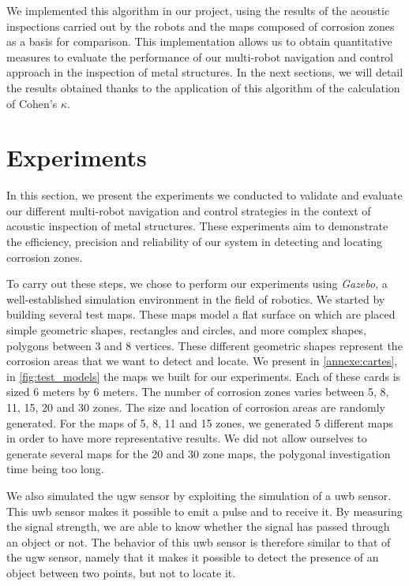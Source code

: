 We implemented this algorithm in our project, using the results of the acoustic inspections carried out by the robots and the maps composed of corrosion zones as a basis for comparison.
This implementation allows us to obtain quantitative measures to evaluate the performance of our multi-robot navigation and control approach in the inspection of metal structures.
In the next sections, we will detail the results obtained thanks to the application of this algorithm of the calculation of Cohen's $\kappa$.

\section{Experiments}

In this section, we present the experiments we conducted to validate and evaluate our different multi-robot navigation and control strategies in the context of acoustic inspection of metal structures.
These experiments aim to demonstrate the efficiency, precision and reliability of our system in detecting and locating corrosion zones.

To carry out these steps, we chose to perform our experiments using \textit{Gazebo}, a well-established simulation environment in the field of robotics.
We started by building several test maps.
These maps model a flat surface on which are placed simple geometric shapes, rectangles and circles, and more complex shapes, polygons between 3 and 8 vertices.
These different geometric shapes represent the corrosion areas that we want to detect and locate.
We present in \ref{annexe:cartes}, in \ref{fig:test_models} the maps we built for our experiments.
Each of these cards is sized 6 meters by 6 meters.
The number of corrosion zones varies between 5, 8, 11, 15, 20 and 30 zones.
The size and location of corrosion areas are randomly generated.
For the maps of 5, 8, 11 and 15 zones, we generated 5 different maps in order to have more representative results.
We did not allow ourselves to generate several maps for the 20 and 30 zone maps, the polygonal investigation time being too long.

We also simulated the \gls{ugw} sensor by exploiting the simulation of a \gls{uwb} sensor.
This \gls{uwb} sensor makes it possible to emit a pulse and to receive it.
By measuring the signal strength, we are able to know whether the signal has passed through an object or not.
The behavior of this \gls{uwb} sensor is therefore similar to that of the \gls{ugw} sensor, namely that it makes it possible to detect the presence of an object between two points, but not to locate it.

